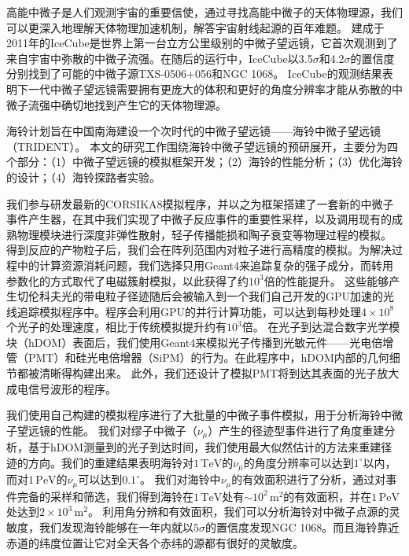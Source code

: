 \begin{cabstract}

高能中微子是人们观测宇宙的重要信使，通过寻找高能中微子的天体物理源，我们可以更深入地理解天体物理加速机制，解答宇宙射线起源的百年难题。
建成于2011年的IceCube是世界上第一台立方公里级别的中微子望远镜，它首次观测到了来自宇宙中弥散的中微子流强。在随后的运行中，IceCube以3.5$\sigma$和4.2$\sigma$的置信度分别找到了可能的中微子源TXS-0506+056和NGC 1068。
IceCube的观测结果表明下一代中微子望远镜需要拥有更庞大的体积和更好的角度分辨率才能从弥散的中微子流强中确切地找到产生它的天体物理源。

海铃计划旨在中国南海建设一个次时代的中微子望远镜——海铃中微子望远镜（TRIDENT）。
本文的研究工作围绕海铃中微子望远镜的预研展开，主要分为四个部分：（1）中微子望远镜的模拟框架开发；（2）海铃的性能分析；（3）优化海铃的设计；（4）海铃探路者实验。

我们参与研发最新的CORSIKA8模拟程序，并以之为框架搭建了一套新的中微子事件产生器，在其中我们实现了中微子反应事件的重要性采样，以及调用现有的成熟物理模块进行深度非弹性散射，轻子传播能损和陶子衰变等物理过程的模拟。
得到反应的产物粒子后，我们会在阵列范围内对粒子进行高精度的模拟。为解决过程中的计算资源消耗问题，我们选择只用Geant4来追踪复杂的强子成分，而转用参数化的方式取代了电磁簇射模拟，以此获得了约$10^3$倍的性能提升。
这些能够产生切伦科夫光的带电粒子径迹随后会被输入到一个我们自己开发的GPU加速的光线追踪模拟程序中。程序会利用GPU的并行计算功能，可以达到每秒处理$4\times 10^8$个光子的处理速度，相比于传统模拟提升约有$10^3$倍。
在光子到达混合数字光学模块（hDOM）表面后，我们使用Geant4来模拟光子传播到光敏元件——光电倍增管（PMT）和硅光电倍增器（SiPM）的行为。在此程序中，hDOM内部的几何细节都被清晰得构建出来。
此外，我们还设计了模拟PMT将到达其表面的光子放大成电信号波形的程序。

我们使用自己构建的模拟程序进行了大批量的中微子事件模拟，用于分析海铃中微子望远镜的性能。
我们对缪子中微子（$\nu_\mu$）产生的径迹型事件进行了角度重建分析，基于hDOM测量到的光子到达时间，我们使用最大似然估计的方法来重建径迹的方向。我们的重建结果表明海铃对$1\,\mathrm{TeV}$的$\nu_\mu$的角度分辨率可以达到$1^\circ$以内，而对$1\,\mathrm{PeV}$的$\nu_\mu$可以达到$0.1^\circ$。
我们对海铃中$\nu_\mu$的有效面积进行了分析，通过对事件完备的采样和筛选，我们得到海铃在$1\,\mathrm{TeV}$处有$\sim 10^2\,\mathrm{m^2}$的有效面积，并在$1\,\mathrm{PeV}$处达到$2\times 10^3\,\mathrm{m^2}$。
利用角分辨和有效面积，我们可以分析海铃对中微子点源的灵敏度，我们发现海铃能够在一年内就以$5\sigma$的置信度发现NGC 1068。而且海铃靠近赤道的纬度位置让它对全天各个赤纬的源都有很好的灵敏度。


\end{cabstract}
